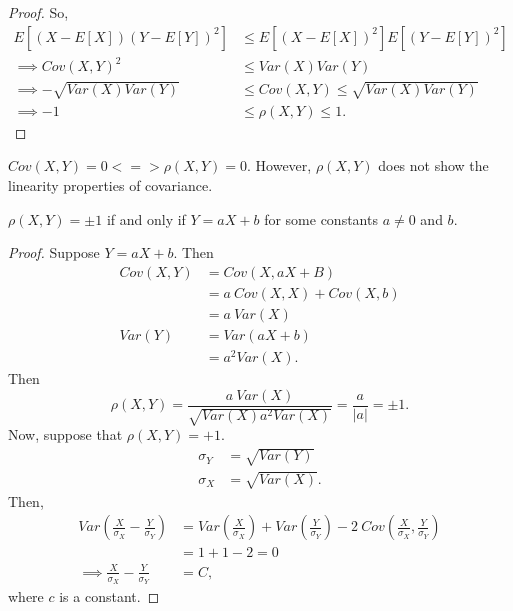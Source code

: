 \begin{definition}
\begin{proof}
		So,
		\begin{align*}
			E\left[ \left( X - E\left[ X \right]  \right)\left( Y - E\left[ Y \right]  \right) ^2  \right]  &\le E\left[ \left( X - E\left[ X \right]  \right) ^2 \right] E\left[ \left( Y - E\left[ Y \right]  \right) ^2 \right] \\
			\implies Cov\left( X, Y \right) ^2 &\le Var \left( X \right) Var\left( Y \right) \\
			\implies -\sqrt{Var\left( X \right) Var\left( Y \right) } &\le  Cov\left( X, Y \right) \le  \sqrt{Var\left( X \right) Var\left( Y \right) } \\
			\implies -1 &\le  \rho\left( X, Y \right) \le 1
		.\end{align*}
	\end{proof}
\end{definition}
\begin{note}
	$Cov\left( X, Y \right)  = 0 < = > \rho\left( X, Y \right)  = 0$. However, $\rho\left( X, Y \right) $ does not show the linearity properties of covariance. 
\end{note}

\begin{theorem}
	$\rho\left( X, Y \right) = \pm 1 $ if and only if $Y = aX + b$ for some constants $a \not = 0$ and $b$.
	\begin{proof}
		Suppose $Y = aX + b$. Then 
		\begin{align*}
			Cov\left( X, Y \right)  &=  Cov\left( X, aX + B \right)  \\
						&= a\ Cov\left( X, X \right) + Cov\left( X, b \right)  \\
						&= a \ Var\left( X \right)  \\
			Var\left( Y \right) &= Var\left( aX + b \right)  \\
					    &= a^2 Var\left( X \right)  
		.\end{align*}
		Then
		\[
			\rho\left( X, Y \right) = \frac{a \ Var\left( X \right) }{\sqrt{Var\left( X \right) a^2 Var\left( X \right) } } = \frac{a}{\left| a \right| } = \pm 1
		.\] 
		Now, suppose that $\rho\left( X, Y \right) = +1 $. 
		\begin{align*}
			\sigma_Y &=  \sqrt{Var\left( Y \right) }  \\
			\sigma_X &= \sqrt{Var\left( X \right) }  
		.\end{align*}
		Then, 
		\begin{align*}
			Var\left( \frac{X}{\sigma_X} - \frac{Y}{\sigma_Y} \right) &= Var\left( \frac{X}{\sigma_X} \right) + Var\left( \frac{Y}{\sigma_Y} \right)  - 2\ Cov\left( \frac{X}{\sigma_X} , \frac{Y}{\sigma_Y} \right)  \\
			&= 1 + 1 - 2 = 0 \\ 
			\implies \frac{X}{\sigma_{X}} - \frac{Y}{\sigma_Y} &=  C 
		,\end{align*}
		where  $c$ is a constant.

	\end{proof}
\end{theorem}
